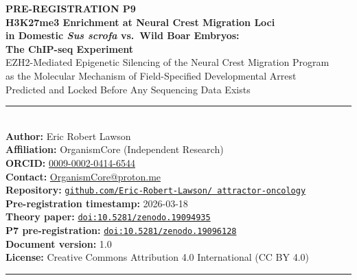\documentclass[10pt, a4paper]{article}
\begin{document}
\begin{center}
  {\LARGE\bfseries\color{headergreen}
  PRE-REGISTRATION P9}\\[0.4em]
  {\Large\bfseries
  H3K27me3 Enrichment at Neural Crest Migration
  Loci\\
  in Domestic \textit{Sus scrofa} vs.\
  Wild Boar Embryos:}\\[0.3em]
  {\large\bfseries
  The ChIP-seq Experiment}\\[0.4em]
  {\large
  EZH2-Mediated Epigenetic Silencing of the
  Neural Crest Migration Program\\
  as the Molecular Mechanism of
  Field-Specified Developmental Arrest\\
  Predicted and Locked Before Any
  Sequencing Data Exists}\\[0.6em]
  \noindent\textcolor{rulecolor}
  {\rule{\linewidth}{1pt}}\\[0.4em]
  {\normalsize
  \textbf{Author:} Eric Robert Lawson\\
  \textbf{Affiliation:} OrganismCore
  (Independent Research)\\
  \textbf{ORCID:}
  \href{https://orcid.org/0009-0002-0414-6544}
  {0009-0002-0414-6544}\\
  \textbf{Contact:}
  \href{mailto:OrganismCore@proton.me}
  {OrganismCore@proton.me}\\
  \textbf{Repository:}
  \href{https://github.com/Eric-Robert-Lawson/
  attractor-oncology}
  {\texttt{github.com/Eric-Robert-Lawson/
  attractor-oncology}}\\
  \textbf{Pre-registration timestamp:}
  2026-03-18\\
  \textbf{Theory paper:}
  \href{https://doi.org/10.5281/zenodo.19094935}
  {\texttt{doi:10.5281/zenodo.19094935}}\\
  \textbf{P7 pre-registration:}
  \href{https://doi.org/10.5281/zenodo.19096128}
  {\texttt{doi:10.5281/zenodo.19096128}}\\
  \textbf{Document version:} 1.0\\
  \textbf{License:}
  Creative Commons Attribution 4.0
  International (CC BY 4.0)}\\[0.4em]
  \noindent\textcolor{rulecolor}
  {\rule{\linewidth}{1pt}}
\end{center}

\vspace{0.5em}
\end{document}
